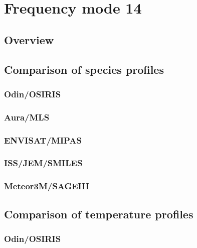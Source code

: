 \section{Frequency mode 14}
\label{sec:fm14}

\subsection{Overview}
\label{sec:fm14:overview}

\subsection{Comparison of species profiles}
\label{sec:fm14:comparison:species}

\subsubsection{Odin/OSIRIS}
\label{sec:fm14:comparison:species:osiris}

\subsubsection{Aura/MLS}
\label{sec:fm14:comparison:species:mls}

\subsubsection{ENVISAT/MIPAS}
\label{sec:fm14:comparison:species:mipas}

\subsubsection{ISS/JEM/SMILES}
\label{sec:fm14:comparison:species:smiles}

\subsubsection{Meteor3M/SAGEIII}
\label{sec:fm14:comparison:species:sage3}


\subsection{Comparison of temperature profiles}
\label{sec:fm14:comparison:temperature}

\subsubsection{Odin/OSIRIS}
\label{sec:fm14:comparison:temperature:osiris}

